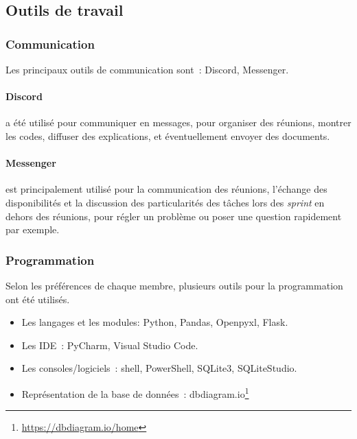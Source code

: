 \documentclass[12pt]{article}
\begin{document}
\subsection{Outils de travail}

    \subsubsection{Communication}
    Les principaux outils de communication sont~: \textsf{Discord}, \textsf{Messenger}.
    \paragraph{\textsf{Discord}} a été utilisé pour communiquer en messages, pour organiser des réunions, montrer les codes, diffuser des explications, et éventuellement envoyer des documents.
    \paragraph{\textsf{Messenger}} est principalement utilisé pour la communication des réunions, l'échange des disponibilités et la discussion des particularités des tâches lors des \textsl{sprint} en dehors des réunions, pour régler un problème ou poser une question rapidement par exemple.
    
    \subsubsection{Programmation}
    Selon les préférences de chaque membre, plusieurs outils pour la programmation ont été utilisés.
    \begin{itemize}[label=\textbullet]
        \item Les langages et les modules: \textsf{Python}, \textsf{Pandas}, \textsf{Openpyxl}, \textsf{Flask}.
        \item Les IDE~: \textsf{PyCharm}, \textsf{Visual Studio Code}.
        \item Les consoles/logiciels~: \textsf{shell}, \textsf{PowerShell}, \textsf{SQLite3}, \textsf{SQLiteStudio}.
        \item Représentation de la base de données~: \textsf{dbdiagram.io}\footnote{\url{https://dbdiagram.io/home}}
    \end{itemize}
    
\end{document}
